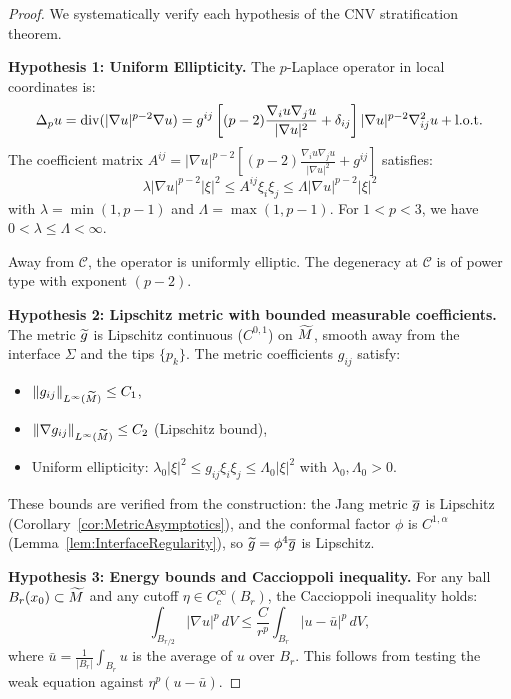 \begin{proof}
We systematically verify each hypothesis of the CNV stratification theorem.

\textbf{Hypothesis 1: Uniform Ellipticity.}
The $p$-Laplace operator in local coordinates is:
\begin{equation}
    \Delta_p u = \mathrm{div}(|\nabla u|^{p-2} \nabla u) = g^{ij} \left[ (p-2) \frac{\nabla_i u \nabla_j u}{|\nabla u|^2} + \delta_{ij} \right] |\nabla u|^{p-2} \nabla^2_{ij} u + \text{l.o.t.}
\end{equation}
The coefficient matrix $A^{ij} = |\nabla u|^{p-2} \left[ (p-2) \frac{\nabla_i u \nabla_j u}{|\nabla u|^2} + g^{ij} \right]$ satisfies:
\begin{equation}
    \lambda |\nabla u|^{p-2} |\xi|^2 \le A^{ij} \xi_i \xi_j \le \Lambda |\nabla u|^{p-2} |\xi|^2
\end{equation}
with $\lambda = \min(1, p-1)$ and $\Lambda = \max(1, p-1)$. For $1 < p < 3$, we have $0 < \lambda \le \Lambda < \infty$.

Away from $\mathcal{C}$, the operator is uniformly elliptic. The degeneracy at $\mathcal{C}$ is of power type with exponent $(p-2)$.

\textbf{Hypothesis 2: Lipschitz metric with bounded measurable coefficients.}
The metric $\widetilde{g}$ is Lipschitz continuous ($C^{0,1}$) on $\widetilde{M}$, smooth away from the interface $\Sigma$ and the tips $\{p_k\}$. The metric coefficients $g_{ij}$ satisfy:
\begin{itemize}
    \item $\|g_{ij}\|_{L^\infty(\widetilde{M})} \le C_1$,
    \item $\|\nabla g_{ij}\|_{L^\infty(\widetilde{M})} \le C_2$ (Lipschitz bound),
    \item Uniform ellipticity: $\lambda_0 |\xi|^2 \le g_{ij} \xi_i \xi_j \le \Lambda_0 |\xi|^2$ with $\lambda_0, \Lambda_0 > 0$.
\end{itemize}
These bounds are verified from the construction: the Jang metric $\overline{g}$ is Lipschitz (Corollary~\ref{cor:MetricAsymptotics}), and the conformal factor $\phi$ is $C^{1,\alpha}$ (Lemma~\ref{lem:InterfaceRegularity}), so $\widetilde{g} = \phi^4 \overline{g}$ is Lipschitz.

\textbf{Hypothesis 3: Energy bounds and Caccioppoli inequality.}
For any ball $B_r(x_0) \subset \widetilde{M}$ and any cutoff $\eta \in C^\infty_c(B_r)$, the Caccioppoli inequality holds:
\begin{equation}\label{eq:Caccioppoli-G}
    \int_{B_{r/2}} |\nabla u|^p \, dV \le \frac{C}{r^p} \int_{B_r} |u - \bar{u}|^p \, dV,
\end{equation}
where $\bar{u} = \frac{1}{|B_r|}\int_{B_r} u$ is the average of $u$ over $B_r$. This follows from testing the weak equation against $\eta^p (u - \bar{u})$.


\end{proof}
